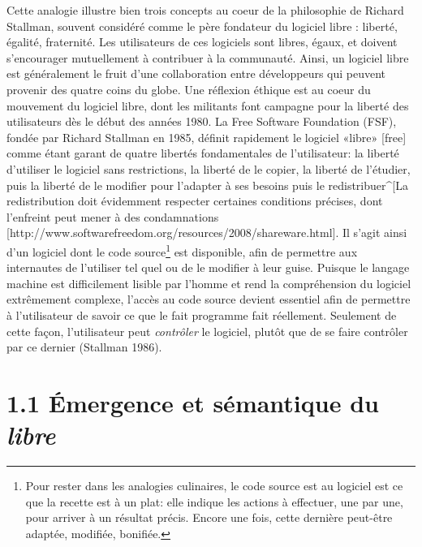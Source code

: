 \documentclass[
  letterpaper,
]{scrbook}
\begin{document}
Cette analogie illustre bien trois concepts au coeur de la philosophie
de Richard Stallman, souvent considéré comme le père fondateur du
logiciel libre : liberté, égalité, fraternité. Les utilisateurs de ces
logiciels sont libres, égaux, et doivent s'encourager mutuellement à
contribuer à la communauté. Ainsi, un logiciel libre est généralement le
fruit d'une collaboration entre développeurs qui peuvent provenir des
quatre coins du globe. Une réflexion éthique est au coeur du mouvement
du logiciel libre, dont les militants font campagne pour la liberté des
utilisateurs dès le début des années 1980. La Free Software Foundation
(FSF), fondée par Richard Stallman en 1985, définit rapidement le
logiciel «libre» {[}free{]} comme étant garant de quatre libertés
fondamentales de l'utilisateur: la liberté d'utiliser le logiciel sans
restrictions, la liberté de le copier, la liberté de l'étudier, puis la
liberté de le modifier pour l'adapter à ses besoins puis le
redistribuer\^{}{[}La redistribution doit évidemment respecter certaines
conditions précises, dont l'enfreint peut mener à des condamnations
{[}http://www.softwarefreedom.org/resources/2008/shareware.html{]}. Il
s'agit ainsi d'un logiciel dont le code source\footnote{Pour rester dans
  les analogies culinaires, le code source est au logiciel est ce que la
  recette est à un plat: elle indique les actions à effectuer, une par
  une, pour arriver à un résultat précis. Encore une fois, cette
  dernière peut-être adaptée, modifiée, bonifiée.} est disponible, afin
de permettre aux internautes de l'utiliser tel quel ou de le modifier à
leur guise. Puisque le langage machine est difficilement lisible par
l'homme et rend la compréhension du logiciel extrêmement complexe,
l'accès au code source devient essentiel afin de permettre à
l'utilisateur de savoir ce que le fait programme fait réellement.
Seulement de cette façon, l'utilisateur peut \emph{contrôler} le
logiciel, plutôt que de se faire contrôler par ce dernier (Stallman
1986).

\hypertarget{uxe9mergence-et-suxe9mantique-du-libre}{%
\section{\texorpdfstring{1.1 Émergence et sémantique du
\emph{libre}}{1.1 Émergence et sémantique du libre}}\label{uxe9mergence-et-suxe9mantique-du-libre}}
\end{document}
